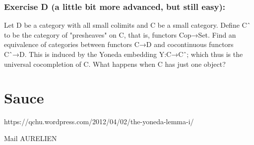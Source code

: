 \documentclass[12pt,makeidx, draft]{amsart}
\begin{document}
\section{Exercise D (a little bit more advanced, but still easy):} Let D be a category with all small colimits and C be a small category. Define Cˆ to be the category of "presheaves" on C, that is, functors Cop→Set. Find an equivalence of categories between functors C→D and cocontinuous functors Cˆ→D. This is induced by the Yoneda embedding Y:C→Cˆ; which thus is the universal cocompletion of C. What happens when C has just one object? 

\part{Sauce}
https://qchu.wordpress.com/2012/04/02/the-yoneda-lemma-i/


Mail AURELIEN
\end{document}
